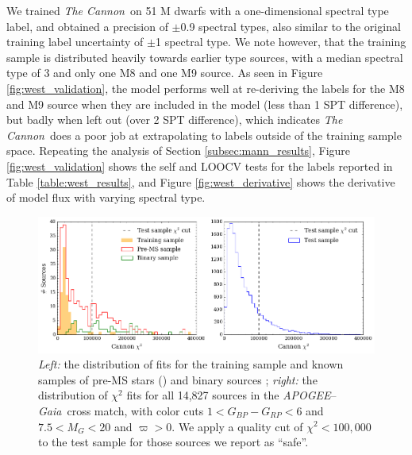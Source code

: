 \documentclass[twocolumn]{aastex62}
\newcommand{\apogee}{\textsl{APOGEE}}
\newcommand{\thecannon}{\textsl{The Cannon}}
\newcommand{\gaia}{\textsl{Gaia}}
\begin{document}
We trained \thecannon\ on 51 M dwarfs with a one-dimensional spectral type label, and obtained a precision of $\pm$0.9 spectral types, also similar to the original training label uncertainty of $\pm$1 spectral type. We note however, that the training sample is distributed heavily towards earlier type sources, with a median spectral type of 3 and only one M8 and one M9 source. As seen in Figure \ref{fig:west_validation}, the model performs well at re-deriving the labels for the M8 and M9 source when they are included in the model (less than 1 SPT difference), but badly when left out (over 2 SPT difference), which indicates \thecannon\ does a poor job at extrapolating to labels outside of the training sample space. Repeating the analysis of Section \ref{subsec:mann_results}, Figure \ref{fig:west_validation} shows the self and LOOCV tests for the labels reported in Table \ref{table:west_results}, and Figure \ref{fig:west_derivative} shows the derivative of model flux with varying spectral type.



\begin{figure}
	\includegraphics[width=\linewidth]{figures/cannon_chi_dist.png}
	\caption{\textit{Left:} the distribution of fits for the training sample and known samples of pre-MS stars (\citealt{Cottaar:2014}) and binary sources \citep{ElBadry:2018,Skinner:2018}; \textit{right:} the distribution of $\chi^2$ fits for all 14,827 sources in the \apogee --\gaia\ cross match, with color cuts $1<G_{BP}-G_{RP}<6$ and $7.5<M_{G}<20$ and $\varpi>0$. We apply a quality cut of $\chi^2 < 100,000$ to the test sample for those sources we report as ``safe''.}
	\label{fig:chi_dist}
\end{figure}
\end{document}
